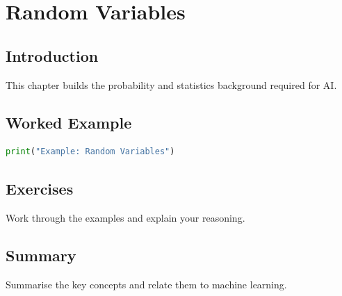 \chapter{Random Variables}
\label{chap:vol4-22}



\section{Introduction}
This chapter builds the probability and statistics background required for AI.

\section{Worked Example}
\begin{lstlisting}[language=Python]
print("Example: Random Variables")
\end{lstlisting}

\section{Exercises}
\begin{exercise}
Work through the examples and explain your reasoning.
\end{exercise}

\section{Summary}
Summarise the key concepts and relate them to machine learning.
